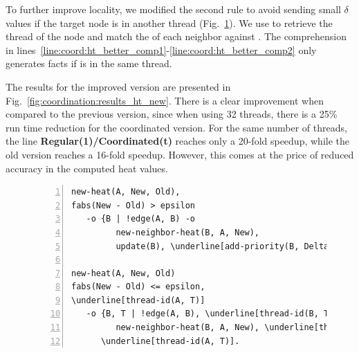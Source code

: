 To further improve locality, we modified the second rule to avoid sending small
$\delta$ values if the target node is in another thread
(Fig.~\ref{code:coord:ht_better}). We use  to retrieve the
thread  of the node  and match the  of each
neighbor  against . The comprehension in
lines~\ref{line:coord:ht_better_comp1}-\ref{line:coord:ht_better_comp2} only
generates  facts if  is in the same thread.

The results for the improved version are presented in
Fig.~\ref{fig:coordination:results_ht_new}. There is a clear improvement when
compared to the previous version, since when using 32 threads, there is a 25\%
run time reduction for the coordinated version. For the same number of threads,
the line \textbf{Regular(1)/Coordinated(t)} reaches only a 20-fold speedup,
while the old version reaches a 16-fold speedup. However, this comes at the
price of reduced accuracy in the computed heat values.

\begin{figure}[h!]
\begin{Verbatim}[numbers=left,fontsize=\codesize,commandchars=\\\[\]]
new-heat(A, New, Old),
fabs(New - Old) > epsilon
   -o {B | !edge(A, B) -o
         new-neighbor-heat(B, A, New),
         update(B), \underline[add-priority(B, Delta)]}.

new-heat(A, New, Old)
fabs(New - Old) <= epsilon,
\underline[thread-id(A, T)]
   -o {B, T | !edge(A, B), \underline[thread-id(B, T)] -o\label[line:coord:ht_better_comp1]
         new-neighbor-heat(B, A, New), \underline[thread-id(B, T)]},\label[line:coord:ht_better_comp2]
      \underline[thread-id(A, T)].
\end{Verbatim}

  \label{code:coord:ht_better}
\end{figure}

